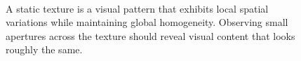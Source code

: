\begin{figure}[t]
\begin{center}
	\\
	\caption[A static texture.]{A static texture is a visual pattern that exhibits local spatial variations while maintaining global homogeneity. Observing small apertures across the texture should reveal visual content that looks roughly the same.}
	\vspace{-0.65cm}
	\label{fig:texture}
\end{center}
\end{figure}